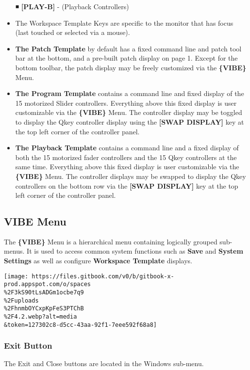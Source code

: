 \documentclass[
]{article}
\begin{document}
\begin{itemize}
  ◾ \textbf{{[}PLAY-B{]}} - (Playback Controllers)
\item
  The Workspace Template Keys are specific to the monitor that has focus (last touched or selected via a mouse).
\item
  \textbf{The Patch Template} by default has a fixed command line and patch tool bar at the bottom, and a pre-built patch display on page 1. Except for the bottom toolbar, the patch display may be freely customized via the \textbf{\{VIBE\}} Menu.
\item
  \textbf{The Program Template} contains a command line and fixed display of the 15 motorized Slider controllers. Everything above this fixed display is user customizable via the \textbf{\{VIBE\}} Menu. The controller display may be toggled to display the Qkey controller display using the \textbf{{[}SWAP DISPLAY{]}} key at the top left corner of the controller panel.
\item
  \textbf{The Playback Template} contains a command line and a fixed display of both the 15 motorized fader controllers and the 15 Qkey controllers at the same time. Everything above this fixed display is user customizable via the \textbf{\{VIBE\}} Menu. The controller displays may be swapped to display the Qkey controllers on the bottom row via the \textbf{{[}SWAP DISPLAY{]}} key at the top left corner of the controller panel.
\end{itemize}

\hypertarget{vibe-menu}{%
\subsection{VIBE Menu}\label{vibe-menu}}

The \textbf{\{VIBE\}} Menu is a hierarchical menu containing logically grouped sub-menus. It is used to access common system functions such as \textbf{Save} and \textbf{System Settings} as well as configure \textbf{Workspace Template} displays.

\texttt{[image: https://files.gitbook.com/v0/b/gitbook-x-prod.appspot.com/o/spaces\\\%2F3kS90tLsADGm1ocbe7q9\\\%2Fuploads\\\%2FhnmbOYCxpKpFeS3PTChB\\\%2F4.2.webp?alt=media\\\&token=127302c8-d5cc-43aa-92f1-7eee592f68a8]}

\hypertarget{exit-button}{%
\subsubsection{Exit Button}\label{exit-button}}

The Exit and Close buttons are located in the Windows sub-menu.
\end{document}
